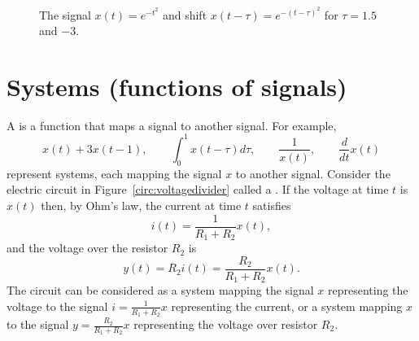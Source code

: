 \begin{figure}[p]
  \centering
  \caption{The signal $x(t) = e^{-t^2}$ and shift $x(t - \tau) = e^{-(t-\tau)^2}$ for $\tau = 1.5$ and $-3$.} \label{fig:timeshifter}
\end{figure}







\section{Systems (functions of signals)}\label{sec:syst-funct-sign}

A  is a function that maps a signal to another signal.  For example,
\[
x(t) + 3 x(t-1), \qquad \int_{0}^{1} x(t - \tau) d\tau, \qquad \frac{1}{x(t)}, \qquad \frac{d}{dt} x(t)
\]
represent systems, each mapping the signal $x$ to another signal.  
Consider the electric circuit in Figure~\ref{circ:voltagedivider} called a .  If the voltage at time $t$ is $x(t)$ then, by Ohm's law, the current at time $t$ satisfies
\[
i(t) = \frac{1}{R_1 + R_2} x(t),
\]
and the voltage over the resistor $R_2$ is
\begin{equation}\label{eq:voltagedivider}
y(t) = R_2 i(t) = \frac{R_2}{R_1 + R_2} x(t).
\end{equation}
The circuit can be considered as a system mapping the signal $x$ representing the voltage to the signal $i = \tfrac{1}{R_1+R_2}x$ representing the current, or a system mapping $x$ to the signal $y=\frac{R_2}{R_1 + R_2}x$ representing the voltage over resistor $R_2$.

